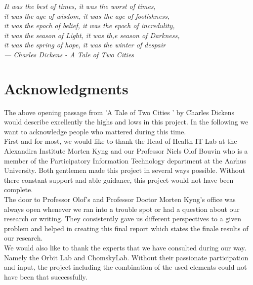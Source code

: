 
\begin{flushright}{\slshape    
	It was the best of times, it was the worst of times,\\
	it was the age of wisdom, it was the age of foolishness,\\ 
	it was the epoch of belief, it was the epoch of incredulity,\\ 
	it was the season of Light, it was th,e season of Darkness,\\
	it was the spring of hope, it was the winter of despair\\ \medskip
    --- Charles Dickens - A Tale of Two Cities \cite{dickens}}
\end{flushright}



\bigskip

\begingroup
\let\clearpage\relax
\let\cleardoublepage\relax
\let\cleardoublepage\relax
\chapter*{Acknowledgments}

The above opening passage from 'A Tale of Two  Cities ' by Charles Dickens would describe excellently the highs and lows in this project. In the following we want to acknowledge people who mattered during this time.\\

First and for most, we would like to thank the Head of Health IT Lab at the Alexandira Institute Morten Kyng and our Professor Niels Olof Bouvin who is a member of the Participatory Information Technology department at the Aarhus University. Both gentlemen made this project in several ways possible. Without there constant support and able guidance, this project would not have been complete.\\

The door to Professor Olof's and Professor Doctor Morten Kyng's office was always open whenever we ran into a trouble spot or had a question about our research or writing. They consistently gave us different perspectives to a given problem and helped in creating this final report which states the finale results of our research.\\

We would also like to thank the experts that we have consulted during our way. Namely the Orbit Lab and ChomskyLab. Without their passionate participation and input, the project including the combination of the used elements could not have been that successfully.
\endgroup



